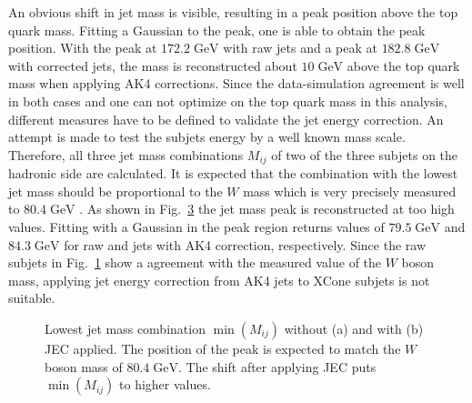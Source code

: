  	An obvious shift in jet mass is visible, resulting in a peak position above the top quark mass. Fitting a Gaussian to the peak, one is able to obtain the peak position. With the peak at $172.2\;\text{GeV}$ with raw jets and a peak at $182.8\;\text{GeV}$ with corrected jets, the mass is reconstructed about $10\;\text{GeV}$ above the top quark mass when applying AK4 corrections. Since the data-simulation agreement is well in both cases and one can not optimize on the top quark mass in this analysis, different measures have to be defined to validate the jet energy correction. An attempt is made to test the subjets energy by a well known mass scale. Therefore, all three jet mass combinations $M_{ij}$ of two of the three subjets on the hadronic side are calculated. It is expected that the combination with the lowest jet mass should be proportional to the $W$ mass which is very precisely measured to $80.4\;\text{GeV}$ \cite{Wmass}. As shown in Fig.~\ref{fig:Wmass} the jet mass peak is reconstructed at too high values. Fitting with a Gaussian in the peak region returns values of $79.5\;\text{GeV}$ and $84.3\;\text{GeV}$ for raw and jets with AK4 correction, respectively. Since the raw subjets in Fig.~\ref{fig:Wmass1} show a agreement with the measured value of the $W$ boson mass, applying jet energy correction from AK4 jets to XCone subjets is not suitable.\\
  	\begin{figure}[tb]
  		\begin{subfigure}{.5\textwidth}
  		\centering
  		\caption{}
  		\label{fig:Wmass1}
  		\end{subfigure}
  		\begin{subfigure}{.5\textwidth}
  		\centering
  		\caption{}
  		\label{fig:Wmass2}
  		\end{subfigure}
  		\caption{Lowest jet mass combination $\min(M_{ij})$ without (a) and with (b) JEC applied. The position of the peak is expected to match the $W$ boson mass of $80.4\;\text{GeV}$. The shift after applying JEC puts $\min(M_{ij})$ to higher values.} 
  		\label{fig:Wmass}
  	\end{figure}	
